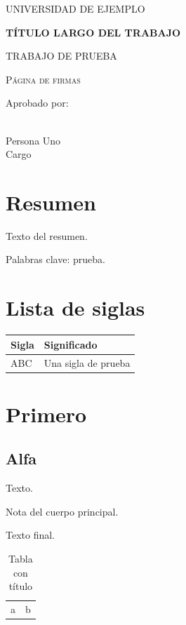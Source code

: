 \documentclass[12pt]{report}
\begin{document}
\null
\thispagestyle{empty}
\clearpage
\begin{titlepage}
\begin{center}
UNIVERSIDAD DE EJEMPLO

\vspace{0.75cm}

{\Large\bfseries
TÍTULO LARGO DEL TRABAJO
}

\vspace{0.75cm}

TRABAJO DE PRUEBA
\end{center}
\end{titlepage}
\clearpage
{}
\begin{center}
    {\Large\scshape Página de firmas}
\end{center}

Aprobado por:

\vspace{2cm}

\hrulefill\\
Persona Uno\\
Cargo

\vspace{\baselineskip}

\clearpage
{}
\chapter*{Resumen}
Texto del resumen.

\vspace{1em}

Palabras clave: prueba.
\tableofcontents
\clearpage
{}
\listoftables
\chapter*{Lista de siglas}
\begin{longtable}{ll}
\toprule
Sigla & Significado\\
\midrule
ABC & Una sigla de prueba\\
\bottomrule
\end{longtable}
\clearpage
{}
\chapter{Primero}
\section{Alfa}
Texto.

{\small Nota del cuerpo principal.}

\vspace{1cm}

Texto final.
\begin{table}[h]
\caption{Tabla con título}
\begin{tabular}{ll}
a & b\\
\end{tabular}
\end{table}
\end{document}
